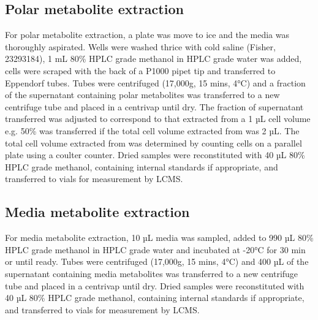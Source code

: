 \subsection{Polar metabolite extraction}
For polar metabolite extraction, a plate was move to ice and the media was thoroughly aspirated.
Wells were washed thrice with cold saline (Fisher, 23293184), 1 mL 80\% HPLC grade methanol in HPLC grade water was added, cells were scraped with the back of a P1000 pipet tip and transferred to Eppendorf tubes.
Tubes were centrifuged (17,000g, 15 mins, 4°C) and a fraction of the supernatant containing polar metabolites was transferred to a new centrifuge tube and placed in a centrivap until dry.
The fraction of supernatant transferred was adjusted to correspond to that extracted from a 1 µL cell volume e.g. 50\% was transferred if the total cell volume extracted from was 2 µL.
The total cell volume extracted from was determined by counting cells on a parallel plate using a coulter counter.
Dried samples were reconstituted with 40 µL 80\% HPLC grade methanol, containing internal standards if appropriate, and transferred to vials for measurement by LCMS.

\subsection{Media metabolite extraction}
For media metabolite extraction, 10 µL media was sampled, added to 990 µL 80\% HPLC grade methanol in HPLC grade water and incubated at -20°C for 30 min or until ready.
Tubes were centrifuged (17,000g, 15 mins, 4°C) and 400 µL of the supernatant containing media metabolites was transferred to a new centrifuge tube and placed in a centrivap until dry.
Dried samples were reconstituted with 40 µL 80\% HPLC grade methanol, containing internal standards if appropriate, and transferred to vials for measurement by LCMS.



